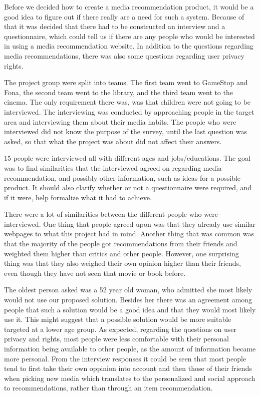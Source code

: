 Before we decided how to create a media recommendation product, it would be a good idea to figure out if there really are a need for such a system. Because of that it was decided that there had to be constructed an interview and a questionnaire, which could tell us if there are any people who would be interested in using a media recommendation website. In addition to the questions regarding media recommendations, there was also some questions regarding user privacy rights.

The project group were split into teams. The first team went to GameStop and Fona, the second team went to the library, and the third team went to the cinema. The only requirement there was, was that children were not going to be interviewed. The interviewing was conducted by approaching people in the target area and interviewing them about their media habits. The people who were interviewed did not know the purpose of the survey, until the last question was asked, so that what the project was about did not affect their answers. 

15 people were interviewed all with different ages and jobs/educations. The goal was to find similarities that the interviewed agreed on regarding media recommendation, and possibly other information, such as ideas for a possible product. It should also clarify whether or not a questionnaire were required, and if it were, help formalize what it had to achieve.

There were a lot of similarities between the different people who were interviewed. One thing that people agreed upon was that they already use similar webpages to what this project had in mind. Another thing that was common was that the majority of the people got recommendations from their friends and weighted them higher than critics and other people. However, one surprising thing was that they also weighed their own opinion higher than their friends, even though they have not seen that movie or book before. 

The oldest person asked was a 52 year old woman, who admitted she most likely would not use our proposed solution. Besides her there was an agreement among people that such a solution would be a good idea and that they would most likely use it. This might suggest that a possible solution would be more suitable targeted at a lower age group. As expected, regarding the questions on user privacy and rights, most people were less comfortable with their personal information being available to other people, as the amount of information became more personal. From the interview responses it could be seen that most people tend to first take their own oppinion into account and then those of their friends when picking new media which translates to the personalized and social approach to recommendations, rather than through an item recommendation. 


